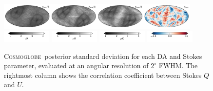 \documentclass[twocolumn]{../../common/aa}
\newcommand{\cosmoglobe}{\textsc{Cosmoglobe}}
\begin{document}
\begin{figure}[p]
	\includegraphics[width=0.9\textwidth]{figures/090-WMAP_W4_std.pdf}
	\includegraphics[width=0.22\textwidth]{figures/cbar_std.pdf}
	\includegraphics[width=0.22\textwidth]{figures/cbar_std.pdf}
	\includegraphics[width=0.22\textwidth]{figures/cbar_std.pdf}
	\includegraphics[width=0.22\textwidth]{figures/cbar_rho.pdf}
	\caption{\cosmoglobe\ posterior standard deviation for each DA and Stokes parameter, evaluated at an angular resolution of $2^{\circ}$ FWHM. The rightmost column shows the correlation coefficient between Stokes $Q$ and $U$.}
        \label{fig:std}
\end{figure}
\end{document}
